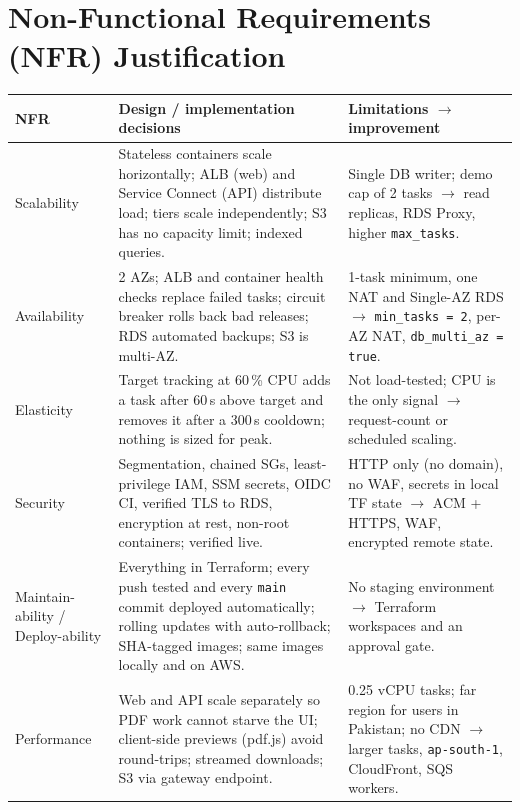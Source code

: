 \documentclass[11pt,a4paper]{article}
\begin{document}
\section{Non-Functional Requirements (NFR) Justification}
\begin{table}[H]
\centering\footnotesize
\begin{tabularx}{\textwidth}{L{2.05cm}L{8.1cm}X}
\toprule
\textbf{NFR} & \textbf{Design / implementation decisions} & \textbf{Limitations $\rightarrow$ improvement}\\
\midrule
Scalability & Stateless containers scale horizontally; ALB (web) and Service Connect (API) distribute load; tiers scale independently; S3 has no capacity limit; indexed queries. & Single DB writer; demo cap of 2 tasks $\rightarrow$ read replicas, RDS Proxy, higher \texttt{max\_tasks}.\\
Availability & 2 AZs; ALB and container health checks replace failed tasks; circuit breaker rolls back bad releases; RDS automated backups; S3 is multi-AZ. & 1-task minimum, one NAT and Single-AZ RDS $\rightarrow$ \texttt{min\_tasks = 2}, per-AZ NAT, \texttt{db\_multi\_az = true}.\\
Elasticity & Target tracking at 60\,\% CPU adds a task after 60\,s above target and removes it after a 300\,s cooldown; nothing is sized for peak. & Not load-tested; CPU is the only signal $\rightarrow$ request-count or scheduled scaling.\\
Security & Segmentation, chained SGs, least-privilege IAM, SSM secrets, OIDC CI, verified TLS to RDS, encryption at rest, non-root containers; verified live. & HTTP only (no domain), no WAF, secrets in local TF state $\rightarrow$ ACM + HTTPS, WAF, encrypted remote state.\\
Maintain-\newline ability / Deploy-\newline ability & Everything in Terraform; every push tested and every \texttt{main} commit deployed automatically; rolling updates with auto-rollback; SHA-tagged images; same images locally and on AWS. & No staging environment $\rightarrow$ Terraform workspaces and an approval gate.\\
Performance & Web and API scale separately so PDF work cannot starve the UI; client-side previews (pdf.js) avoid round-trips; streamed downloads; S3 via gateway endpoint. & 0.25 vCPU tasks; far region for users in Pakistan; no CDN $\rightarrow$ larger tasks, \texttt{ap-south-1}, CloudFront, SQS workers.\\

\end{tabularx}
\end{table}
\end{document}
